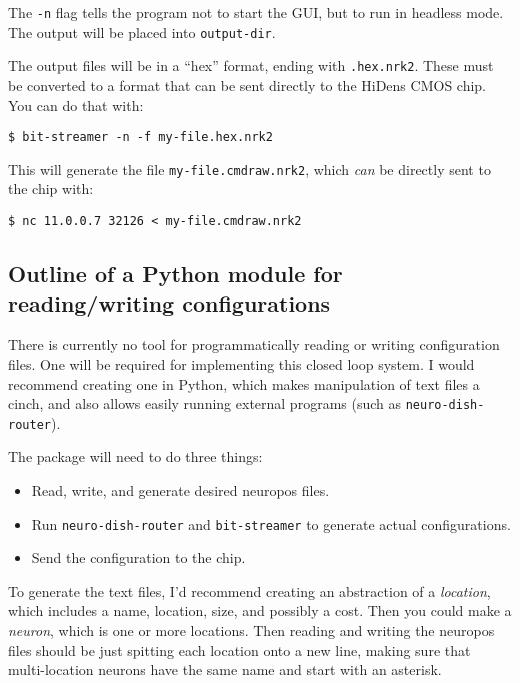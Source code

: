 \documentclass[12pt]{article}
\begin{document}
The \texttt{-n} flag tells the program not to start the GUI, but to run in
headless mode. The output will be placed into \texttt{output-dir}.

The output files will be in a ``hex'' format, ending with \texttt{.hex.nrk2}.
These must be converted to a format that can be sent directly
to the HiDens CMOS chip. You can do that with:

\begin{verbatim}
$ bit-streamer -n -f my-file.hex.nrk2
\end{verbatim}

This will generate the file \texttt{my-file.cmdraw.nrk2}, which \textit{can}
be directly sent to the chip with:

\begin{verbatim}
$ nc 11.0.0.7 32126 < my-file.cmdraw.nrk2
\end{verbatim}

\subsection*{Outline of a Python module for reading/writing configurations}

There is currently no tool for programmatically reading or writing configuration
files. One will be required for implementing this closed loop system. I would
recommend creating one in Python, which makes manipulation of text files a cinch,
and also allows easily running external programs (such as \texttt{neuro-dish-router}).

The package will need to do three things:

\begin{itemize}
	\item {Read, write, and generate desired neuropos files.}
	\item {Run \texttt{neuro-dish-router} and \texttt{bit-streamer} to
		generate actual configurations.}
	\item {Send the configuration to the chip.}
\end{itemize}

To generate the text files, I'd recommend creating an abstraction of a
\textit{location}, which includes a name, location, size, and possibly
a cost. Then you could make a \textit{neuron}, which is one or
more locations. Then reading and writing the neuropos files should be
just spitting each location onto a new line, making sure that multi-location
neurons have the same name and start with an asterisk.
\end{document}
